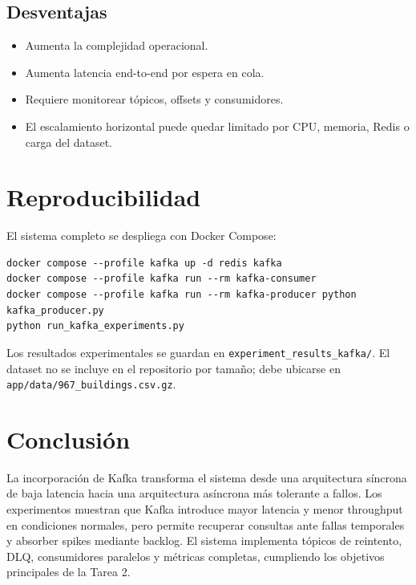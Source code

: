 \documentclass[11pt,letterpaper]{article}
\begin{document}
\subsection{Desventajas}

\begin{itemize}
    \item Aumenta la complejidad operacional.
    \item Aumenta latencia end-to-end por espera en cola.
    \item Requiere monitorear tópicos, offsets y consumidores.
    \item El escalamiento horizontal puede quedar limitado por CPU, memoria, Redis o carga del dataset.
\end{itemize}

\section{Reproducibilidad}

El sistema completo se despliega con Docker Compose:

\begin{verbatim}
docker compose --profile kafka up -d redis kafka
docker compose --profile kafka run --rm kafka-consumer
docker compose --profile kafka run --rm kafka-producer python kafka_producer.py
python run_kafka_experiments.py
\end{verbatim}

Los resultados experimentales se guardan en \texttt{experiment\_results\_kafka/}. El dataset no se incluye en el repositorio por tamaño; debe ubicarse en \texttt{app/data/967\_buildings.csv.gz}.

\section{Conclusión}

La incorporación de Kafka transforma el sistema desde una arquitectura síncrona de baja latencia hacia una arquitectura asíncrona más tolerante a fallos. Los experimentos muestran que Kafka introduce mayor latencia y menor throughput en condiciones normales, pero permite recuperar consultas ante fallas temporales y absorber spikes mediante backlog. El sistema implementa tópicos de reintento, DLQ, consumidores paralelos y métricas completas, cumpliendo los objetivos principales de la Tarea 2.
\end{document}
